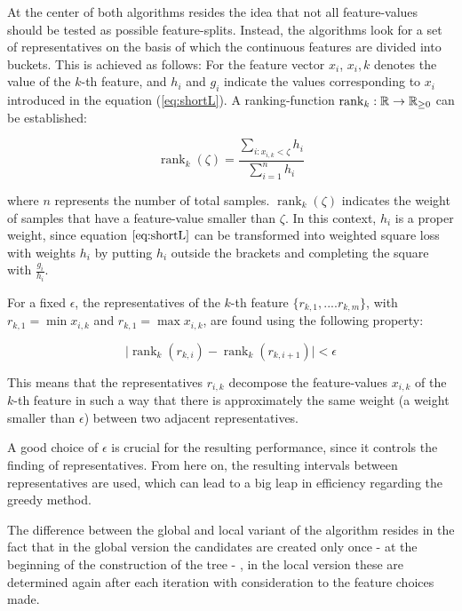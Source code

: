 \newcommand{\rnk}{\operatorname{rank}}
At the center of both algorithms resides the idea that not all feature-values should be tested as possible feature-splits. Instead, the algorithms look for a set of representatives on the basis of which the continuous features are divided into buckets. This is achieved as follows: For the feature vector $x_i$, $x_i,k$ denotes the value of the $k$-th feature, and $h_i$ and $g_i$ indicate the values corresponding to $x_i$ introduced in the equation (\ref{eq:shortL}).
A ranking-function $\rnk_k : \R\to \R_{\geq 0}$ can be established:

\begin{equation} \label{eq:ranking}
	\rnk_k(\zeta) = \frac{\sum\limits_{i: x_{i,k} < \zeta} h_i}{\sum\limits_{i=1}^n h_i}
\end{equation}

where $n$ represents the number of total samples. $\rnk_k(\zeta)$ indicates the weight of samples that have a feature-value smaller than $\zeta$. In this context, $h_i$ is a proper weight, since equation $\ref{eq:shortL}$ can be transformed into weighted square loss with weights $h_i$ by putting $h_i$ outside the brackets and completing the square with $\frac{g_i}{h_i}$.

For a fixed $\epsilon$, the representatives of the $k$-th feature $\{r_{k,1}, ... .r_{k,m}\}$, with $r_{k,1} = \min x_{i,k}$ and $r_{k,1} = \max x_{i,k}$, are found using the following property:

\begin{equation}
	\mid \rnk_k(r_{k,i}) - \rnk_k(r_{k,i+1}) \mid < \epsilon
\end{equation}

This means that the representatives $r_{i,k}$ decompose the feature-values $x_{i,k}$ of the $k$-th feature in such a way that there is approximately the same weight (a weight smaller than $\epsilon$) between two adjacent representatives.

A good choice of $\epsilon$ is crucial for the resulting performance, since it controls the finding of representatives. From here on, the resulting intervals between representatives are used, which can lead to a big leap in efficiency regarding the greedy method.

The difference between the global and local variant of the algorithm resides in the fact that in the global version the candidates are created only once - at the beginning of the construction of the tree - , in the local version these are determined again after each iteration with consideration to the feature choices made.

